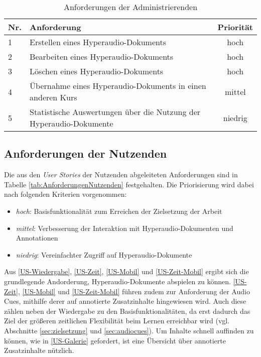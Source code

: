 \begin{table}[!ht]
\def\arraystretch{1.4}
\caption{Anforderungen der Administrierenden}
\label{tab:AnforderungenAdministrierenden}
 \begin{tabularx}{\textwidth}{lXc}      
    \hline
    Nr. & Anforderung & Priorität
    \\\hline
    1 & Erstellen eines Hyperaudio-Dokuments & hoch\\
    2 & Bearbeiten eines Hyperaudio-Dokuments & hoch\\
    3 & Löschen eines Hyperaudio-Dokuments & hoch\\
    4 & Übernahme eines Hyperaudio-Dokuments in einen anderen Kurs & mittel\\
    5 & Statistische Auswertungen über die Nutzung der Hyperaudio-Dokumente & niedrig\\
    \hline
    \end{tabularx}
\end{table}

\subsection{Anforderungen der Nutzenden}
\label{sub:AnforderungenDerNutzenden}
Die aus den \textit{User Stories} der Nutzenden abgeleiteten Anforderungen sind in Tabelle \ref{tab:AnforderungenNutzenden} festgehalten. Die Priorisierung wird dabei nach folgenden Kriterien vorgenommen:

\begin{itemize}
\item \textit{hoch}: Basisfunktionalität zum Erreichen der Zielsetzung der Arbeit
\item \textit{mittel}: Verbesserung der Interaktion mit Hyperaudio-Dokumenten und Annotationen
\item \textit{niedrig}: Vereinfachter Zugriff auf Hyperaudio-Dokumente
\end{itemize}


Aus \ref{US-Wiedergabe}, \ref{US-Zeit}, \ref{US-Mobil} und \ref{US-Zeit-Mobil} ergibt sich die grundlegende Andorderung, Hyperaudio-Dokumente abspielen zu können. \ref{US-Zeit}, \ref{US-Mobil} und \ref{US-Zeit-Mobil} führen zudem zur Anforderung der Audio Cues, mithilfe derer auf annotierte Zusatzinhalte hingewiesen wird. Auch diese zählen neben der Wiedergabe zu den Basisfunktionalitäten, da erst dadurch das Ziel der größeren zeitlichen Flexibilität beim Lernen erreichbar wird (vgl. Abschnitte \ref{sec:zielsetzung} und \ref{sec:audiocues}). Um Inhalte schnell auffinden zu können, wie in \ref{US-Galerie} gefordert, ist eine Übersicht über annotierte Zusatzinhalte nützlich.

